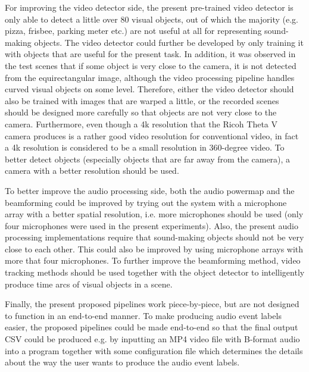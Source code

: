 For improving the video detector side, the present pre-trained video detector is only able to detect a little over 80 visual objects, out of which the majority (e.g. pizza, frisbee, parking meter etc.) are not useful at all for representing sound-making objects. The video detector could further be developed by only training it with objects that are useful for the present task. In addition, it was observed in the test scenes that if some object is very close to the camera, it is not detected from the equirectangular image, although the video processing pipeline handles curved visual objects on some level. Therefore, either the video detector should also be trained with images that are warped a little, or the recorded scenes should be designed more carefully so that objects are not very close to the camera. Furthermore, even though a 4k resolution that the Ricoh Theta V camera produces is a rather good video resolution for conventional video, in fact a 4k resolution is considered to be a small resolution in 360-degree video. To better detect objects (especially objects that are far away from the camera), a camera with a better resolution should be used.

To better improve the audio processing side, both the audio powermap and the beamforming could be improved by trying out the system with a microphone array with a better spatial resolution, i.e. more microphones should be used (only four microphones were used in the present experiments). Also, the present audio processing implementations require that sound-making objects should not be very close to each other. This could also be improved by using microphone arrays with more that four microphones. To further improve the beamforming method, video tracking methods should be used together with the object detector to intelligently produce time arcs of visual objects in a scene.

Finally, the present proposed pipelines work piece-by-piece, but are not designed to function in an end-to-end manner. To make producing audio event labels easier, the proposed pipelines could be made end-to-end so that the final output CSV could be produced e.g. by inputting an MP4 video file with B-format audio into a program together with some configuration file which determines the details about the way the user wants to produce the audio event labels.


